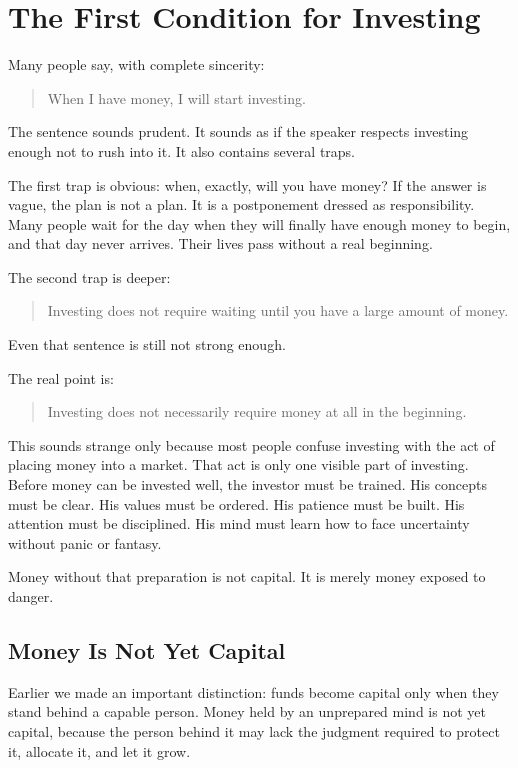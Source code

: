 \chapter{The First Condition for Investing}

Many people say, with complete sincerity:

\begin{quote}
When I have money, I will start investing.
\end{quote}

The sentence sounds prudent. It sounds as if the speaker respects investing enough not to rush into it. It also contains several traps.

The first trap is obvious: when, exactly, will you have money? If the answer is vague, the plan is not a plan. It is a postponement dressed as responsibility. Many people wait for the day when they will finally have enough money to begin, and that day never arrives. Their lives pass without a real beginning.

The second trap is deeper:

\begin{quote}
Investing does not require waiting until you have a large amount of money.
\end{quote}

Even that sentence is still not strong enough.

The real point is:

\begin{quote}
Investing does not necessarily require money at all in the beginning.
\end{quote}

This sounds strange only because most people confuse investing with the act of placing money into a market. That act is only one visible part of investing. Before money can be invested well, the investor must be trained. His concepts must be clear. His values must be ordered. His patience must be built. His attention must be disciplined. His mind must learn how to face uncertainty without panic or fantasy.

Money without that preparation is not capital. It is merely money exposed to danger.

\section*{Money Is Not Yet Capital}

Earlier we made an important distinction: funds become capital only when they stand behind a capable person. Money held by an unprepared mind is not yet capital, because the person behind it may lack the judgment required to protect it, allocate it, and let it grow.

